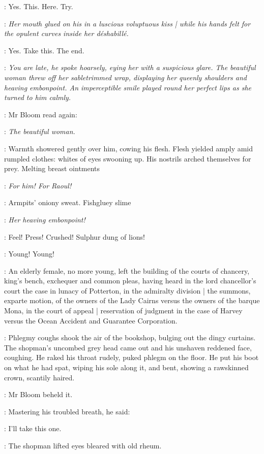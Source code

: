 \BloomInt:
Yes.
This.
Here.
Try.

\BloomInt:
\emph{Her mouth glued on his in a luscious voluptuous kiss |
while his hands felt for the opulent curves inside her déshabillé.}

\BloomInt:
Yes.
Take this.
The end.

\BloomInt:
\emph{You are late,
he spoke hoarsely,
eying her with a suspicious glare.
The beautiful woman threw off her sabletrimmed wrap,
displaying her queenly shoulders and heaving embonpoint.
An imperceptible smile played round her perfect lips
as she turned to him calmly.}

:
Mr Bloom read again:

\BloomInt:
\emph{The beautiful woman.}

\BloomInt:
Warmth showered gently over him,
cowing his flesh.
Flesh yielded amply amid rumpled clothes:
whites of eyes swooning up.
His nostrils arched themselves for prey.
Melting breast ointments

\BloomInt:
\emph{For him!
For Raoul!}

\BloomInt:
Armpits' oniony sweat.
Fishgluey slime

\BloomInt:
\emph{Her heaving embonpoint!}

\BloomInt:
Feel!
Press!
Crushed!
Sulphur dung of lions!

\BloomInt:
Young!
Young!

:
An elderly female,
no more young,
left the building of the courts of chancery,
king's bench,
exchequer
and common pleas,
having heard in the lord chancellor's court
the case in lunacy of Potterton,
in the admiralty division |
the summons,
exparte motion,
of the owners of the Lady Cairns
versus the owners of the barque Mona,
in the court of appeal |
reservation of judgment
in the case of Harvey versus
the Ocean Accident and Guarantee Corporation.

:
Phlegmy coughs shook the air of the bookshop,
bulging out the dingy curtains.
The shopman's uncombed grey head came out
and his unshaven reddened face,
coughing.
He raked his throat rudely,
puked phlegm on the floor.
He put his boot on what he had spat,
wiping his sole along it,
and bent,
showing a rawskinned crown,
scantily haired.

:
Mr Bloom beheld it.

:
Mastering his troubled breath,
he said:

\Bloom:
I'll take this one.

:
The shopman lifted eyes
bleared with old rheum.

